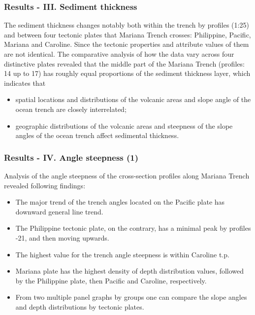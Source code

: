 \documentclass[pdflatex,compress,10pt,
	xcolor={dvipsnames,dvipsnames,svgnames,x11names,table},
	hyperref={colorlinks = true,breaklinks = true, urlcolor = NavyBlue, breaklinks = true}]{beamer}
\begin{document}
\begin{frame}\frametitle{Results - III. Sediment thickness}
The sediment thickness changes notably both within the trench by profiles (1:25) and between four tectonic plates that Mariana Trench crosses: Philippine, Pacific, Mariana and Caroline. Since the tectonic properties and attribute values of them are not identical. The comparative analysis of how the data vary across four distinctive plates revealed that the middle part of the Mariana Trench (profiles: 14 up to 17) has roughly equal proportions of the sediment thickness layer, which indicates that
    	\begin{itemize}
    		 \item spatial locations and distributions of the volcanic areas and slope angle of the ocean trench are closely interrelated; 
		 \item geographic distributions of the volcanic areas and steepness of the slope angles of the ocean trench affect sedimental thickness. 
	\end{itemize}
\end{frame}
	
\begin{frame}\frametitle{Results - IV. Angle steepness (1)}
Analysis of the angle steepness of the cross-section profiles along Mariana Trench revealed following findings:
    	\begin{itemize}
		 \item The major trend of the trench angles located on the Pacific plate has downward general line trend. 
		 \item The Philippine tectonic plate, on the contrary, has a minimal peak by profiles \textnumero {}-21, and then moving upwards. 
		 \item The highest value for the trench angle steepness is within Caroline t.p. 
		 \item Mariana plate has the highest density of depth distribution values, followed by the Philippine plate, then Pacific and Caroline, respectively. 
		 \item From two multiple panel graphs by groups one can compare the slope angles and depth distributions by tectonic plates. 
	\end{itemize}
\end{frame}
\end{document}
